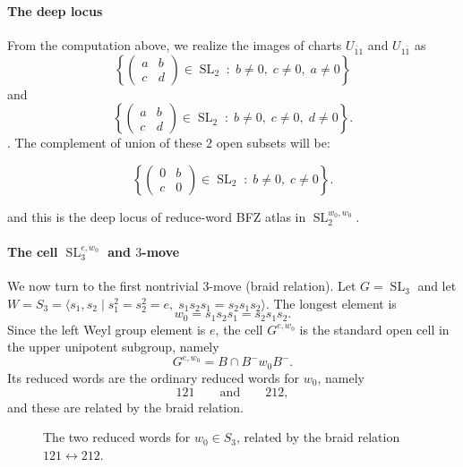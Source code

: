 \documentclass[12pt]{amsart}
\newcommand{\SL}{\operatorname{SL}}
\theoremstyle{plain}
\theoremstyle{definition}
\theoremstyle{remark}
\begin{document}
\paragraph{\bf The deep locus}
From the computation above, we realize the images of charts $U_{\bar{1}1}$ and $U_{1\bar{1}}$ as $$\left\{
\begin{pmatrix} a & b \\ c & d \end{pmatrix}\in \SL_2 \;:\; b\neq 0,\; c\neq 0,\; a\neq 0
\right\}$$ and $$\left\{
\begin{pmatrix} a & b \\ c & d \end{pmatrix}\in \SL_2 \;:\; b\neq 0,\; c\neq 0,\; d\neq 0
\right\}.$$. The complement of union of these $2$ open subsets will be:

$$\left\{
\begin{pmatrix} 0 & b \\ c & 0 \end{pmatrix}\in \SL_2 \;:\; b\neq 0,\; c\neq 0
\right\}.$$

and this is the deep locus of reduce-word BFZ atlas in $\SL_2^{w_0,w_0}$.

\bigskip


\paragraph{\bf The cell $\SL_3^{e,w_0}$ and $3$-move}

We now turn to the first nontrivial $3$-move (braid relation). 
Let $G=\SL_3$ and let $W=S_3=\langle s_1,s_2 \mid s_1^2=s_2^2=e,\; s_1s_2s_1=s_2s_1s_2\rangle$. 
The longest element is
\[
w_0=s_1s_2s_1=s_2s_1s_2.
\]
Since the left Weyl group element is $e$, the cell $G^{e,w_0}$ is the standard open cell in the upper unipotent subgroup, namely
\[
G^{e,w_0}=B\cap B^-w_0B^-.
\]
Its reduced words are the ordinary reduced words for $w_0$, namely
\[
121
\qquad\text{and}\qquad
212,
\]
and these are related by the braid relation.

\begin{figure}[ht]
\centering
{}
\caption{The two reduced words for $w_0\in S_3$, related by the braid relation $121\leftrightarrow 212$.}
\label{fig:sl3-word-graph}
\end{figure}
\end{document}
